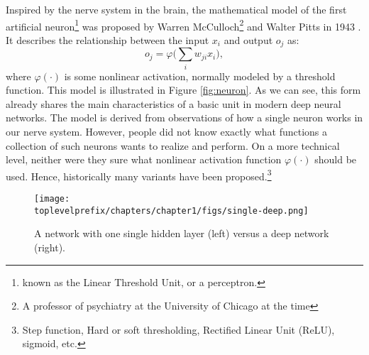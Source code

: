 \documentclass[\toplevelprefix/book-main.tex]{subfiles}
\begin{document}
Inspired by the nerve system in the brain, the mathematical model of the first artificial neuron\footnote{known as the  Linear Threshold Unit, or a perceptron.} was proposed by Warren McCulloch\footnote{A professor of psychiatry at the University of Chicago at the time} and Walter Pitts in 1943 \cite{McCulloch-Pitts}. It describes the relationship between the input $x_i$ and output $o_j$ as:
\begin{equation}
    o_j = \varphi\Big( \sum_i w_{ji}x_i\Big),  
\end{equation}
where $\varphi(\cdot)$ is some nonlinear activation, normally modeled by a threshold function. This model is illustrated in Figure \ref{fig:neuron}. As we can see, this form already shares the main characteristics of a basic unit in modern deep neural networks. The model is derived from observations of how a single neuron works in our nerve system. However, people did not know exactly what functions a collection of such neurons wants to realize and perform. On a more technical level, neither were they sure what nonlinear activation function $\varphi(\cdot)$ should be used. Hence, historically many variants have been proposed.\footnote{Step function, Hard or soft thresholding, Rectified Linear Unit (ReLU), sigmoid, etc.
}

\begin{figure}[t]
\centering
\texttt{[image: \\toplevelprefix/chapters/chapter1/figs/single-deep.png]}
    \caption{A network with one single hidden layer (left) versus a deep network (right).  }
    \label{fig:single-deep}
\end{figure}
\end{document}
